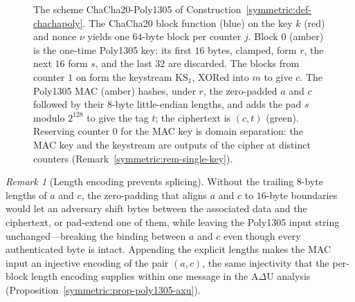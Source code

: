 \documentclass[11pt,a4paper]{article}
\theoremstyle{definition}
\theoremstyle{remark}
\newtheorem{remark}[theorem]{Remark}
\begin{document}
\begin{figure}[tp]
\caption{The scheme \textsf{ChaCha20-Poly1305} of
Construction~\ref{symmetric:def-chachapoly}. The \textsf{ChaCha20} block
function (blue) on the key $k$ (red) and nonce $\nu$ yields one $64$-byte block
per counter $j$. Block $0$ (amber) is the one-time \textsf{Poly1305} key: its
first $16$ bytes, clamped, form $r$, the next $16$ form $s$, and the last $32$
are discarded. The blocks from counter $1$ on form the keystream
$\mathrm{KS}_{1}$, XORed into $m$ to give $c$. The \textsf{Poly1305} MAC (amber)
hashes, under $r$, the zero-padded $a$ and $c$ followed by their $8$-byte
little-endian lengths, and adds the pad $s$ modulo $2^{128}$ to give the tag
$t$; the ciphertext is $(c, t)$ (green). Reserving counter $0$ for the MAC key
is domain separation: the MAC key and the keystream are outputs of the cipher at
distinct counters (Remark~\ref{symmetric:rem-single-key}).}
\label{fig:aead}
\end{figure}

\begin{remark}[Length encoding prevents splicing]
\label{symmetric:rem-length-encoding}
Without the trailing \(8\)-byte lengths of \(a\) and \(c\), the
zero-padding that aligns \(a\) and \(c\) to
\(16\)-byte boundaries would let an adversary shift bytes between the
associated data and the ciphertext, or pad-extend one of them, while
leaving the \textsf{Poly1305} input string unchanged---breaking the
binding between \(a\) and \(c\) even though every authenticated byte
is intact. Appending the explicit lengths makes the MAC input an
injective encoding of the pair \((a, c)\), the same injectivity
that the per-block length encoding supplies within one message in
the A\(\Delta\)U analysis
(Proposition~\ref{symmetric:prop-poly1305-axu}).
\end{remark}
\end{document}
